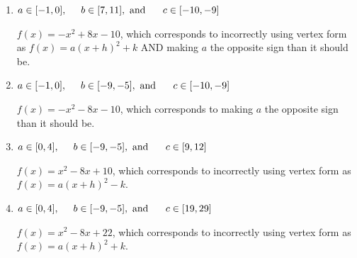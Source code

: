 \documentclass{extbook}[14pt]
\begin{document}
\begin{enumerate}
{\begin{enumerate}[label=\Alph*.]
* $f(x)=x^{2} +8 x + 22$, which is the correct option.
\item \( a \in [-1, 0], \hspace*{5mm} b \in [7, 11], \text{ and } \hspace*{5mm} c \in [-10, -9] \)

$f(x)=-x^{2} +8 x -10$, which corresponds to incorrectly using vertex form as $f(x) = a(x+h)^2+k$ AND making $a$ the opposite sign than it should be.
\item \( a \in [-1, 0], \hspace*{5mm} b \in [-9, -5], \text{ and } \hspace*{5mm} c \in [-10, -9] \)

$f(x)=-x^{2} -8 x -10$, which corresponds to making $a$ the opposite sign than it should be.
\item \( a \in [0, 4], \hspace*{5mm} b \in [-9, -5], \text{ and } \hspace*{5mm} c \in [9, 12] \)

$f(x)=x^{2} -8 x + 10$, which corresponds to incorrectly using vertex form as $f(x) = a(x+h)^2 - k$.
\item \( a \in [0, 4], \hspace*{5mm} b \in [-9, -5], \text{ and } \hspace*{5mm} c \in [19, 29] \)

$f(x)=x^{2} -8 x + 22$, which corresponds to incorrectly using vertex form as $f(x) = a(x+h)^2+k$.
\end{enumerate}

}
\end{enumerate}
\end{document}

